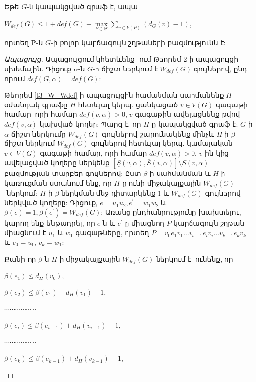 \begin{hide}
\begin{theorem}
\label{t3_Wdef_paths} Եթե $G$-ն կապակցված գրաֆ է, ապա
\begin{center}
$W_{def}(G)\leq 1+def(G)+{\max\limits_{P\in
\mathbf{P}}}{\sum\limits_{v\in V(P)}}\left(d_{G}(v)-1\right)$,
\end{center}
որտեղ $\mathbf{P}$-ն $G$-ի բոլոր կարճագույն շղթաների բազմությունն է:
\end{theorem}
\begin{proof}[Ապացույց] Ապացույցում կհետևենք \cite{AsratianKamalian1994}-ում Թեորեմ 2-ի ապացույցի սխեմային:
Դիցուք $\alpha$-ն $G$-ի ճիշտ ներկում է $W_{def}(G)$ գույներով, ընդ որում $def(G,\alpha)=def(G)$:

Թեորեմ \ref{t3_W_Wdef}-ի ապացույցին համանման սահմանենք $H$ օժանդակ գրաֆը $H$ հետևյալ կերպ. ցանկացած $v\in V(G)$ գագաթի համար, որի համար $def(v,\alpha)>0$, $v$ գագաթին ավելացնենք թվով $def(v,\alpha)$ կախված կողեր: Պարզ է, որ $H$-ը կապակցված գրաֆ է: 
$G$-ի $\alpha$ ճիշտ ներկումը $W_{def}(G)$ գույներով շարունակենք մինչև $H$-ի $\beta$ ճիշտ ներկում $W_{def}(G)$ գույներով հետևյալ կերպ.
կամայական $v\in V(G)$ գագաթի համար, որի համար $def(v,\alpha)>0$, $v$-ին կից ավելացված կողերը ներկենք $\left[\underline
S\left(v,\alpha \right),\overline S\left(v,\alpha
\right)\right]\setminus S(v,\alpha)$ բազմության տարբեր գույներով: Ըստ $\beta$-ի սահմանման և $H$-ի կառուցման ստանում ենք, որ $H$-ը ունի միջակայքային
$W_{def}(G)$-ներկում: $H$-ի $\beta$ ներկման մեջ դիտարկենք $1$ և $W_{def}(G)$ գույներով ներկված կողերը: Դիցուք, $e=u_{1}u_{2},
e^{\prime}=w_{1}w_{2}$ և $\beta(e)=1,
\beta(e^{\prime})=W_{def}(G)$: Առանց ընդհանրությունը խախտելու, կարող ենք ենթադրել, որ $e$-ն և $e^{\prime}$-ը միացնող $P$ կարճագույն շղթան միացնում է 
$u_{1}$ և $w_{1}$ գագաթները, որտեղ $P=v_{0}e_{1}v_{1}\ldots
v_{i-1}e_{i}v_{i}\ldots v_{k-1}e_{k}v_{k}$ և $v_{0}=u_{1}$,
$v_{k}=w_{1}$:

Քանի որ $\beta$-ն $H$-ի միջակայքային $W_{def}(G)$-ներկում է, ունենք, որ

\begin{center}
$\beta(e_{1})\leq d_{H}(v_{0})$,

$\beta(e_{2})\leq \beta(e_{1})+d_{H}(v_{1})-1$,

$\cdots \cdots \cdots \cdots \cdots \cdots$

$\beta(e_{i})\leq \beta(e_{i-1})+d_{H}(v_{i-1})-1$,

$\cdots \cdots \cdots \cdots \cdots \cdots$

$\beta(e_{k})\leq \beta(e_{k-1})+d_{H}(v_{k-1})-1$,


\end{center}
\end{proof}
\end{hide}

